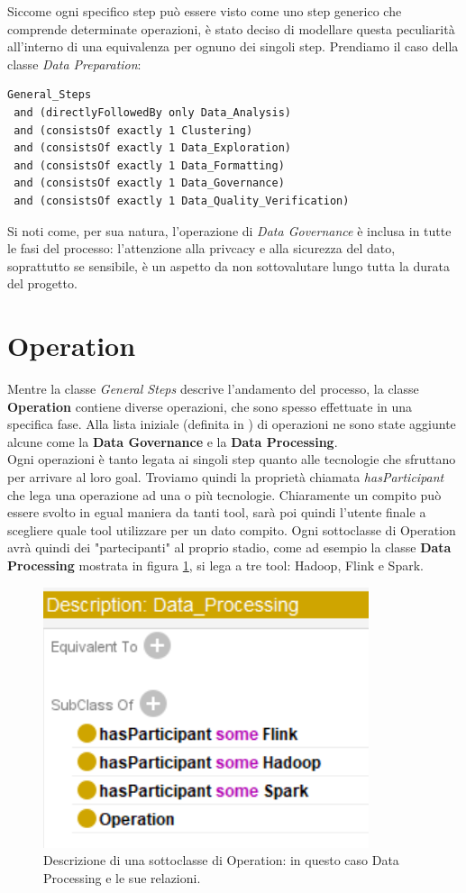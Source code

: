 Siccome ogni specifico step può essere visto come uno step generico che comprende determinate operazioni, è stato deciso di modellare questa peculiarità all'interno di una equivalenza per ognuno dei singoli step. Prendiamo il caso della classe \textit{Data Preparation}:

\begin{verbatim}
General_Steps
 and (directlyFollowedBy only Data_Analysis)
 and (consistsOf exactly 1 Clustering)
 and (consistsOf exactly 1 Data_Exploration)
 and (consistsOf exactly 1 Data_Formatting)
 and (consistsOf exactly 1 Data_Governance)
 and (consistsOf exactly 1 Data_Quality_Verification)
 \end{verbatim}

Si noti come, per sua natura, l'operazione di \textit{Data Governance} è inclusa in tutte le fasi del processo: l'attenzione alla privcacy e alla sicurezza del dato, soprattutto se sensibile, è un aspetto da non sottovalutare lungo tutta la durata del progetto.

\section{Operation}
Mentre la classe \textit{General Steps} descrive l'andamento del processo, la classe \textbf{Operation} contiene diverse operazioni, che sono spesso effettuate in una specifica fase. Alla lista iniziale (definita in \cite{BDOnto}) di operazioni ne sono state aggiunte alcune come la \textbf{Data Governance} e la \textbf{Data Processing}.\\

Ogni operazioni è tanto legata ai singoli step quanto alle tecnologie che sfruttano per arrivare al loro goal. Troviamo quindi la proprietà chiamata \textit{hasParticipant} che lega una operazione ad una o più tecnologie. Chiaramente un compito può essere svolto in egual maniera da tanti tool, sarà poi quindi l'utente finale a scegliere quale tool utilizzare per un dato compito. Ogni sottoclasse di Operation avrà quindi dei "partecipanti" al proprio stadio, come ad esempio la classe \textbf{Data Processing} mostrata in figura \ref{fig:dataprocdesc}, si lega a tre tool: Hadoop, Flink e Spark.

\begin{figure}[H]
    \centering
    \includegraphics{docs/images/dataprocdesc.PNG}
    \caption{Descrizione di una sottoclasse di Operation: in questo caso Data Processing e le sue relazioni.}
    \label{fig:dataprocdesc}
\end{figure}

